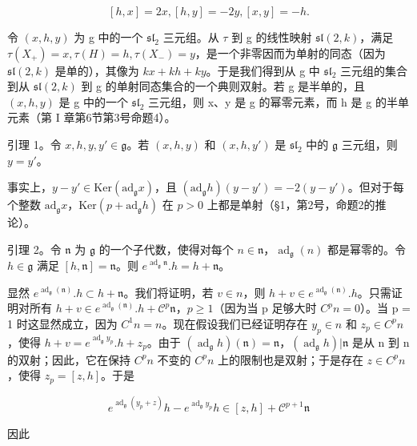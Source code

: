 \[
[ h, x ] = 2 x, [ h, y ] = - 2 y, [ x, y ] = - h.
\]

令 \((x,h,y)\) 为 g 中的一个 \(\mathfrak{sl}_{2}\) 三元组。从 \(\tau\) 到 g 的线性映射 \(\mathfrak{sl}(2,k)\)，满足 \(\tau(X_{+}) = x, \tau(H) = h, \tau(X_{-}) = y\)，是一个非零因而为单射的同态（因为 \(\mathfrak{sl}(2,k)\) 是单的），其像为 \(kx + kh + ky\)。于是我们得到从 g 中 \(\mathfrak{sl}_{2}\) 三元组的集合到从 \(\mathfrak{sl}(2,k)\) 到 g 的单射同态集合的一个典则双射。若 g 是半单的，且 \((x,h,y)\) 是 g 中的一个 \(\mathfrak{sl}_{2}\) 三元组，则 x、y 是 g 的幂零元素，而 h 是 g 的半单元素（第 I 章第6节第3号命题4）。

引理 1。令 \(x, h, y, y' \in \mathfrak{g}\)。若 \((x, h, y)\) 和 \((x, h, y')\) 是 \(\mathfrak{sl}_2\) 中的 \(\mathfrak{g}\) 三元组，则 \(y = y'\)。

事实上，\(y - y' \in \mathrm{Ker}(\mathrm{ad}_{\mathfrak{g}}x)\)，且 \((\mathrm{ad}_{\mathfrak{g}}h)(y - y') = -2(y - y')\)。但对于每个整数 \(\mathrm{ad}_{\mathfrak{g}}x\)，\(\mathrm{Ker}(p + \mathrm{ad}_{\mathfrak{g}}h)\) 在 \(p > 0\) 上都是单射（§1，第2号，命题2的推论）。

引理 2。令 \(\mathfrak{n}\) 为 \(\mathfrak{g}\) 的一个子代数，使得对每个 \(n\in \mathfrak{n}\)，\(\operatorname{ad}_{\mathfrak{g}}(n)\) 都是幂零的。令 \(h\in \mathfrak{g}\) 满足 \([h,\mathfrak{n}] = \mathfrak{n}\)。则 \(e^{\operatorname{ad}_{\mathfrak{g}}\mathfrak{n}}.h = h + \mathfrak{n}\)。

显然 \(e^{\operatorname{ad}_{\mathfrak{g}}(\mathfrak{n})}.h \subset h + \mathfrak{n}\)。我们将证明，若 \(v \in n\)，则 \(h + v \in e^{\operatorname{ad}_{\mathfrak{g}}(\mathfrak{n})}.h\)。只需证明对所有 \(h + v \in e^{\operatorname{ad}_{\mathfrak{g}}(\mathfrak{n})}.h + \mathscr {C} ^ {p} \mathfrak {n}\)，\(p \geq 1\)（因为当 p 足够大时 \(C^{p}n = 0\)）。当 p = 1 时这显然成立，因为 \(C^{1}n = n\)。现在假设我们已经证明存在 \(y_{p} \in n\) 和 \(z_{p} \in C^{p}n\)，使得 \(h + v = e^{\operatorname{ad}_{\mathfrak{g}}y_{p}}.h + z_{p}\)。由于 \((\operatorname{ad}_{\mathfrak{g}}h)(\mathfrak{n}) = \mathfrak{n}\)，\((\operatorname{ad}_{\mathfrak{g}}h)|\mathfrak{n}\) 是从 n 到 n 的双射；因此，它在保持 \(C^{p}n\) 不变的 \(C^{p}n\) 上的限制也是双射；于是存在 \(z \in C^{p}n\)，使得 \(z_{p} = [z, h]\)。于是

\[
e ^ {\operatorname{ad} _ {\mathfrak {g}} \left(y _ {p} + z\right)} h - e ^ {\operatorname{ad} _ {\mathfrak {g}} y _ {p}} h \in [ z, h ] + \mathscr {C} ^ {p + 1} \mathfrak {n}
\]

因此

